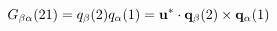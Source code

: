 \begin{equation}                      
G_{\beta \alpha}(21) = q_{\beta}(2) q_{\alpha}(1) = {\bf u}^{*}                       
\cdot{\bf q}_{\beta}(2) \times {\bf q}_{\alpha}(1)                      
\end{equation} 
